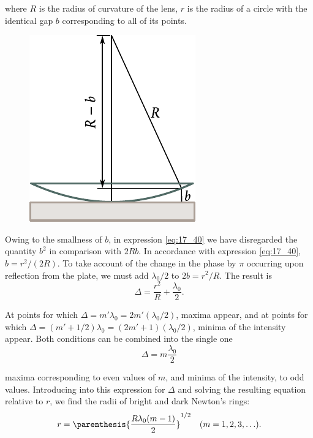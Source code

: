 \noindent
where $R$ is the radius of curvature of the lens, $r$ is the radius of a circle with the identical gap $b$ corresponding to all of its points.

\begin{figure}[!htb]
	\begin{center}
		\includegraphics[scale=1]{figures/ch_17/fig_17_15.pdf}
		\caption[]{}
		\label{fig:17_15}
	\end{center}
	\vspace{-0.8cm}
\end{figure}

Owing to the smallness of $b$, in expression \eqref{eq:17_40} we have disregarded the quantity $b^2$ in comparison with $2Rb$.
In accordance with expression \eqref{eq:17_40}, $b=r^2/(2R)$.
To take account of the change in the phase by $\pi$ occurring upon reflection from the plate, we must add $\lambda_0/2$ to $2b=r^2/R$.
The result is
\begin{equation}\label{eq:17_41}
    \Delta = \frac{r^2}{R} + \frac{\lambda_0}{2}.
\end{equation}

At points for which $\Delta=m'\lambda_0 = 2m'(\lambda_0/2)$, maxima appear, and at points for which $\Delta=(m'+1/2) \lambda_0 = (2m'+1)(\lambda_0/2)$, minima of the intensity appear.
Both conditions can be combined into the single one
\begin{equation*}
    \Delta = m \frac{\lambda_0}{2}
\end{equation*}

\noindent
maxima corresponding to even values of $m$, and minima of the intensity, to odd values.
Introducing into this expression  for $\Delta$ and solving the resulting equation relative to $r$, we find the radii of bright and dark Newton's rings:
\begin{equation}\label{eq:17_42}
    r = \parenthesis{\frac{R \lambda_0 (m-1)}{2}}^{1/2}\quad (m = 1, 2, 3, \ldots).
\end{equation}

